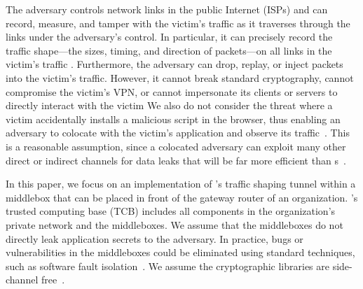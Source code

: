 The adversary controls network links in the public Internet (\eg ISPs) and can
record, measure, and tamper with the victim's traffic as it traverses through the
links under the adversary's control.
In particular, it can precisely record the traffic shape---the sizes, timing,
and direction of packets---on all links in the victim's traffic
.
Furthermore, the adversary can drop, replay, or inject packets into the victim's
traffic.
However, it cannot break standard cryptography, cannot compromise the victim's
VPN, or cannot impersonate its clients or servers to directly interact with the
victim 
We also do not consider the threat where a victim accidentally installs a
malicious script in the browser, thus enabling an adversary to colocate with the
victim's application and observe its
traffic~\cite{schuster2017beautyburst,mehta2022pacer}.  This is a reasonable assumption,
since a colocated adversary can exploit many other direct or indirect channels
for data leaks that will be far more efficient than
{\nsc}s~\cite{kocher2018spectre, yarom2014flushreload, liu2015llcpractical, irazoqui2015ssa, vila2017loophole}.


In this paper, we focus on an implementation of {\sys}'s traffic shaping tunnel
within a middlebox that can be placed in front of the gateway router of an
organization.
%
{\sys}'s trusted computing base (TCB) includes all components in the
organization's private network and the middleboxes. We assume
that the middleboxes do not directly leak application secrets to the adversary.
In practice, bugs or vulnerabilities in the middleboxes could be eliminated
using standard techniques, such as software fault isolation~\cite{tan2017sfi}. We
assume the cryptographic libraries are side-channel
free~\cite{almeida2016verifying}.

